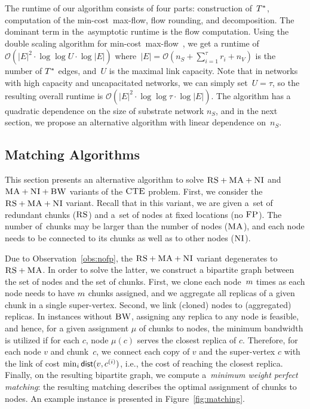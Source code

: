 The runtime of our algorithm consists of four parts: construction of~$T^*$,
computation of the min-cost~max-flow, flow rounding, and decomposition. The
dominant term in the~asymptotic runtime is the flow computation.
Using the double scaling algorithm for min-cost~max-flow~\cite{mincostmaxflow-state}, we get a runtime of~$\mathcal{O}(|E|^2 \cdot\log\log U \cdot \log |E|)$
where~$|E| = \mathcal{O}(n_S+\sum_{i=1}^\tau r_i + n_V)$ is the number of $T^*$ edges, and~$U$ is the maximal link capacity. Note that in networks with high capacity
and uncapacitated networks, we can simply set~$U=\tau$, so the resulting overall runtime is $\mathcal{O}(|E|^2 \cdot\log\log \tau \cdot \log |E|)$.
The algorithm has a quadratic dependence on the size of substrate network $n_S$, and in the next section, we propose an alternative algorithm with linear dependence on~$n_S$.


\subsection{Matching Algorithms}\label{ssec:match}


This section presents an alternative algorithm to solve $\textsc{RS}+\textsc{MA}+\textsc{NI}$ and~$\textsc{MA}+\textsc{NI}+\textsc{BW}$
variants of the $\textsc{CTE}$ problem.
First, we consider the~$\textsc{RS}+\textsc{MA}+\textsc{NI}$ variant.
Recall that in this variant,
we are given a~set of redundant chunks ($\textsc{RS}$) and a~set of nodes
at fixed locations (no $\textsc{FP}$). The number of~chunks may be larger than the number
of nodes ($\textsc{MA}$), and each node needs to be connected
to its chunks as well as to other nodes ($\textsc{NI}$).

 Due to Observation~\ref{obs:nofp}, the $\textsc{RS}+\textsc{MA}+\textsc{NI}$ variant degenerates to~$\textsc{RS}+\textsc{MA}$.
In order to solve the latter,
we construct a bipartite
graph between the set
of nodes and
the set of chunks.
First, we clone each node~$m$ times
as each node needs to have
$m$ chunks assigned, and we aggregate all replicas of a given chunk in a
single %
super-vertex.
Second, we link (cloned) nodes to (aggregated) replicas.
In instances without $\textsc{BW}$, assigning any replica to any node is feasible, and hence, for a given assignment $\mu$ of chunks to nodes, the minimum bandwidth is utilized if for each $c$, node $\mu(c)$ serves the closest replica of $c$.
Therefore, for each node $v$ and chunk~$c$, we connect each copy of $v$ and the super-vertex $c$ with the link of cost $\min_i \mathrm{\textsf{dist}}(v,c^{(i)})$, i.e., the cost of reaching the closest replica.
Finally, on the resulting bipartite graph, we compute a~\emph{minimum weight
perfect
matching}:
the resulting matching describes the optimal assignment of chunks to nodes.
An example instance is presented in Figure~\ref{fig:matching}.



